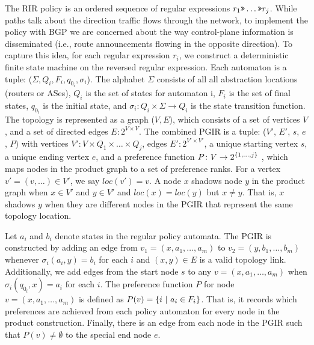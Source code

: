 

The RIR policy is an ordered sequence of regular expressions $r_1 \texttt{>>} \dots \texttt{>>} r_j$. While paths talk about the direction traffic flows through the network, to implement the policy with BGP we are concerned about the way control-plane information is disseminated (i.e., route announcements flowing in the opposite direction). To capture this idea, for each regular expression $r_i$, we construct a deterministic finite state machine on the reversed regular expression. Each automaton is a tuple: ($\Sigma, Q_i, F_i, q_{0_i}, \sigma_i$). The alphabet $\Sigma$ consists of all all abstraction locations (routers or ASes), $Q_i$ is the set of states for automaton i, $F_i$ is the set of final states, $q_{0_i}$ is the initial state, and $\sigma_i \colon Q_i \times \Sigma \rightarrow Q_i$ is the state transition function.
%
The topology is represented as a graph ($V, E$), which consists of a set of vertices $V$, and a set of directed edges $E \colon 2^{V \times V}$.
%
The combined PGIR is a tuple: ($V'$, $E'$, $s$, $e$, $P$) with
vertices $V' \colon V \times Q_1 \times \dots \times Q_j$,
edges $E' \colon 2^{V' \times V'}$,
a unique starting vertex $s$,
a unique ending vertex $e$,
and a preference function $P \colon V \rightarrow 2^{\{ 1, \dots, j \} }$ , which maps nodes in the product graph to a set of preference ranks.
For a vertex $v' = (v, \dots) \in V'$, we say $loc(v') = v$. 
A node $x$ shadows node $y$ in the product graph when $x \in V'$ and $y \in V'$ and $loc(x) = loc(y)$ but $x \neq y$. That is, $x$ shadows $y$ when they are different nodes in the PGIR that represent the same topology location.


Let $a_i$ and $b_i$ denote states in the regular policy automata.
The PGIR is constructed by adding an edge from $v_1 = (x, a_1, \dots, a_m)$ to $v_2 = (y, b_1, \dots, b_m)$ whenever $\sigma_i(a_i, y) = b_i$ for each $i$ and $(x,y) \in E$ is a valid topology link.
%
Additionally, we add edges from the start node $s$ to any $v = (x, a_1, \dots, a_m)$ when $\sigma_i(q_{0_i}, x) = a_i$ for each $i$.
%
The preference function $P$ for node $v = (x, a_1, \dots, a_m)$ is defined as $P(v) = \{ i~\vert~a_i \in F_i \}  $. That is, it records which preferences are achieved from each policy automaton for every node in the product construction.
%
Finally, there is an edge from each node in the PGIR such that $P(v) \neq \emptyset$ to the special end node $e$.


